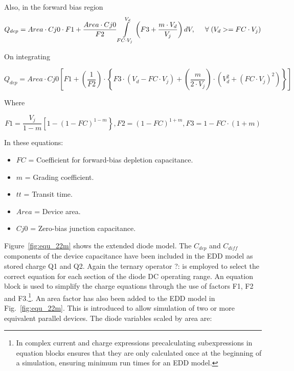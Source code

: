 Also, in the forward bias region 
\begin{equation}
 Q_{dep} = Area \cdot Cj0 \cdot F1 + \dfrac{Area \cdot Cj0}{F2} \int\limits_{FC \cdot V_{j}}^{V_{d}}\left( F3+\dfrac{m \cdot V_d}{V_j}\right) dV, \hspace{5mm} \forall\; (V_{d} >= FC \cdot V_j) 
\end{equation} 

On integrating

\begin{equation}
 Q_{dep} = Area \cdot Cj0 \left[ F1+\left( \dfrac{1}{F2}\right) \cdot \left\lbrace F3\cdot \left( V_{d}-FC \cdot V_{j}\right) + \left( \dfrac{m}{2 \cdot V_{j}}\right) \cdot \left( V_d^{2}+(FC \cdot V_{j})^{2}\right) \right\rbrace \right] 
\end{equation} 

Where

\begin{equation}
 F1 = \dfrac{V_j}{1-m}\left[ 1-\left( 1-FC\right) ^{1-m}\right\rbrace ,
 F2 = \left( 1-FC\right) ^{1+m},
 F3 = 1 - FC \cdot \left( 1+m\right) 
\end{equation} 


In these equations:
\begin{itemize}
 \item  $FC$ = Coefficient for forward-bias depletion capacitance.
 \item  $m $ = Grading coefficient.
 \item  $tt$ = Transit time.
 \item  $Area$ = Device area.
 \item  $Cj0$ = Zero-bias junction capacitance.
\end{itemize}

Figure~\ref{fig:equ_22m} shows the extended diode model. The $C_{dep}$ and
$C_{diff}$ components of the device capacitance have been included in the
EDD model as stored charge Q1 and Q2. Again the ternary operator ?: is
employed to select the correct equation for each section of the diode
DC operating range. An equation block is used to simplify the charge 
equations through the use of factors F1, F2 and F3.\footnote{In complex
current and charge expressions precalculating subexpressions in
equation blocks ensures that they are only calculated once at the
beginning of a simulation, ensuring minimum run times for an EDD
model.}. An area factor has also been added to the EDD model in
Fig.~\ref{fig:equ_22m}. This is introduced to allow simulation of two
or more equivalent parallel devices. The diode variables scaled by
area are:

